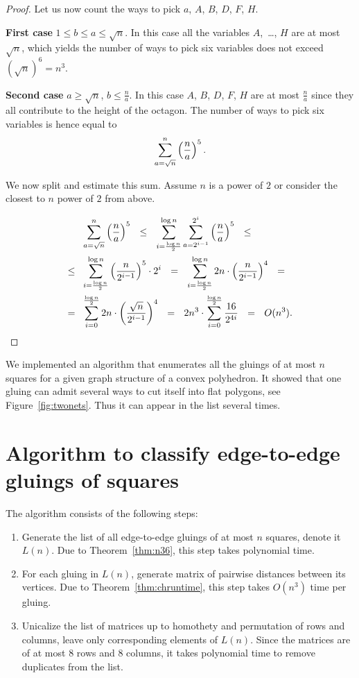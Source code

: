 \documentclass[a4paper,11pt]{article}
\begin{document}
\begin{proof}
Let us now count the ways to pick $a$, $A$, $B$, $D$, $F$, $H$.

{\bfseries First case} \( 1 \le b \le a \le \sqrt{n} \). In this case all the variables $A$,~\ldots, $H$ are at most $\sqrt{n}$, which yields the number of ways to pick six variables does not exceed $(\sqrt{n})^6 = n^3$.

{\bfseries Second case} \(a \ge \sqrt{n}\), \(b \le \frac{n}{a}\). In this case $A$, $B$, $D$, $F$, $H$ are at most $\frac{n}{a}$ since they all contribute to the height of the octagon. The number of ways to pick six variables is hence equal to
	\[ \sum\limits_{a=\sqrt{n}}^n \left( \frac{n}{a} \right)^5.\]

We now split and estimate this sum. Assume $n$ is a power of $2$ or consider the closest to $n$ power of $2$ from above.\vspace{-0.7cm}

\begin{align*}
	& \slim_{a=\sqrt{n}}^n \ll \frac{n}{a} \rr^5\ \ \le\ \ \sloglim
		\slim_{a=2^{i-1}}^{2^i} \ll \frac{n}{a} \rr^5\ \ \le \\
 	\le\ \ & \sloglim \ll \frac{n}{2^{i-1}} \rr^5 \cdot 2^i\ \ =\ \ \sloglim
 		2n \cdot \ll \frac{n}{2^{i-1}} \rr^4\ \ = \\
	=\ \ & \slim_{i=0}^{\frac{\log n}{2}} 2n \cdot \ll \frac{\sqrt{n}}{2^{i-1}} \rr^4
		\ \ =\ \ 2n^3 \cdot \slim_{i=0}^{\frac{\log n}{2}} \frac{16}{2^{4i}}\ \ =\ \ O(n^3).
\end{align*} \end{proof}

We implemented an algorithm that enumerates all the gluings of at most $n$ squares for a given graph structure of a convex polyhedron. It showed that one gluing can admit several ways to cut itself into flat polygons, see Figure~\ref{fig:twonets}. Thus it can appear in the list several times.



\section{Algorithm to classify edge-to-edge gluings of squares}

The algorithm consists of the following steps:

\begin{enumerate}
	\item Generate the list of all edge-to-edge gluings of at most $n$ squares,
	denote it $L(n)$. Due to Theorem~\ref{thm:n36}, this step takes polynomial time.
	\item For each gluing in $L(n)$, generate matrix of pairwise distances
	between its vertices. Due to Theorem~\ref{thm:chruntime},
	this step takes $O(n^3)$ time per gluing.
	\item Unicalize the list of matrices up to homothety and permutation of rows and columns, leave only corresponding elements of $L(n)$. Since the matrices are of at most 8 rows and 8 columns, it takes polynomial time to remove duplicates from the list.
\end{enumerate}
\end{document}
